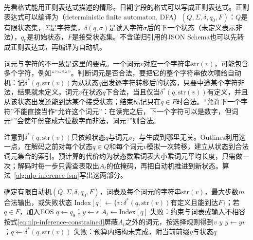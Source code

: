 先看格式能用正则表达式描述的情形。日期字段的格式可以写成正则表达式。正则表达式可以编译为（deterministic finite automaton, DFA）$(Q,\Sigma,\delta,q_0,F)$：$Q$是有限状态集，$\Sigma$是字符集，$\delta(q,\sigma)$是读入字符$\sigma$后的下一个状态（未定义表示非法），$q_0$是初始状态，$F$是接受状态集。不含递归引用的JSON Schema也可以先转成正则表达式，再编译为自动机。

词元与字符的不一致是这里的要点。一个词元$v$对应一个字符串$\mathrm{str}(v)$，可能包含多个字符，例如“”“”“”。判断词元是否合法，要把它的整个字符串依次喂给自动机：记$\delta^*(q,\mathrm{str}(v))$为从状态$q$出发逐字符转移后的状态，只要中途某个字符非法，结果就未定义。词元$v$在状态$q$下合法，当且仅当$\delta^*(q,\mathrm{str}(v))$有定义，并且从该状态出发还能到达某个接受状态；结束标记只在$q\in F$时合法。“允许下一个字符”不能直接当作“允许这个词元”：在读完之后，下一个字符可以是数字，但词元“”会使年份变成六位数字而非法，词元“”则合法。

注意到$\delta^*(q,\mathrm{str}(v))$只依赖状态$q$与词元$v$，与生成到哪里无关。Outlines利用这一点，在解码之前对每个状态$q\in Q$和每个词元$v$模拟一次转移，建立从状态到合法词元集合的索引。预计算的代价约为状态数乘词表大小乘词元平均长度，只需做一次；解码时每一步只需查表取出$A_t$的位掩码，再把自动机推进到新状态。算法~\ref{alg:nlp-inference-fsm}写出这两部分。

\begin{algorithm}[基于有限状态机索引的约束解码]
  \label{alg:nlp-inference-fsm}
  \begin{algorithmic}[1]
    \Require 确定有限自动机$(Q,\Sigma,\delta,q_0,F)$，词表及每个词元的字符串$\mathrm{str}(v)$，最大步数$m$
    \Ensure 合法输出，或失败状态
      \State $\mathrm{Index}[q]\gets\{v:\delta^*(q,\mathrm{str}(v))\text{有定义且能到达}F\}$；若$q\in F$，加入EOS
    \EndFor
    \State $q\gets q_0$；$y\gets\epsilon$
      \State $A_t\gets\mathrm{Index}[q]$
        \State \Return 失败：约束与词表或输入不相容
      \EndIf
      \State 按式\eqref{eq:nlp-inference-constrained}屏蔽$A_t$之外的词元，按选择规则得到$v$
        \State \Return $y$
      \EndIf
      \State $y\gets yv$；$q\gets\delta^*(q,\mathrm{str}(v))$
    \EndFor
    \State \Return 失败：预算内结构未完成，附当前前缀$y$与状态$q$
  \end{algorithmic}
\end{algorithm}

